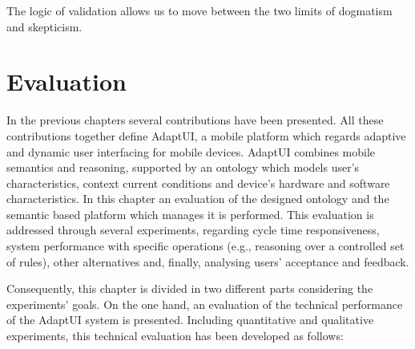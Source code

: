 \begin{savequote}[50mm]
The logic of validation allows us to move between the two limits of dogmatism and skepticism. 
\end{savequote}

\ifpdf
\graphicspath{{5_experiments_and_results/figures/PNG/}
{5_experiments_and_results/figures/PDF/}{5_experiments_and_results/figures/}}
\fi

\chapter{Evaluation}
\label{cha:evaluation}


In the previous chapters several contributions have been presented. All these
contributions together define AdaptUI, a mobile platform which regards adaptive 
and dynamic user interfacing for mobile devices. AdaptUI combines mobile 
semantics and reasoning, supported by an ontology which models user's 
characteristics, context current conditions and device's hardware and software 
characteristics. In this chapter an evaluation of the designed ontology and the 
semantic based platform which manages it is performed. This evaluation is 
addressed through several experiments, regarding cycle time responsiveness, 
system performance with specific operations (e.g., reasoning over a controlled 
set of rules), other alternatives and, finally, analysing users' acceptance and 
feedback.

Consequently, this chapter is divided in two different parts considering the 
experiments' goals. On the one hand, an evaluation of the technical performance
of the AdaptUI system is presented. Including quantitative and qualitative 
experiments, this technical evaluation has been developed as follows:

